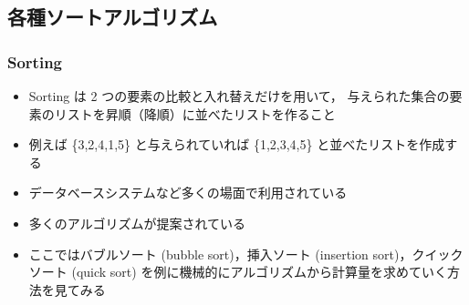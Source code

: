 \subsection{各種ソートアルゴリズム}
\begin{frame}[shrink]
\frametitle{Sorting}
  \begin{itemize}
\item Sorting は 2 つの要素の比較と入れ替えだけを用いて，
与えられた集合の要素のリストを昇順（降順）に並べたリストを作ること
\item 例えば \{3,2,4,1,5\} と与えられていれば \{1,2,3,4,5\} と並べたリストを作成する
\item データベースシステムなど多くの場面で利用されている
\item 多くのアルゴリズムが提案されている
\item ここではバブルソート (bubble sort)，挿入ソート (insertion sort)，クイックソート (quick sort) を例に機械的にアルゴリズムから計算量を求めていく方法を見てみる
  \end{itemize}
\end{frame}
